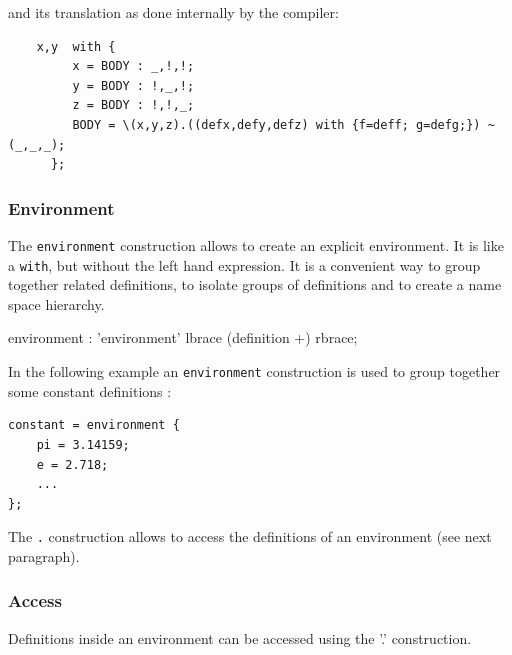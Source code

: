 and its translation as done internally by the compiler:

\begin{lstlisting}
	x,y  with {
		 x = BODY : _,!,!;
		 y = BODY : !,_,!;
		 z = BODY : !,!,_;
		 BODY = \(x,y,z).((defx,defy,defz) with {f=deff; g=defg;}) ~ (_,_,_);
	  };
\end{lstlisting}




\subsubsection{Environment}

The \lstinline'environment' construction allows to create an explicit environment. It is like a \lstinline'with', but without the left hand expression. It is a convenient way to group together related definitions, to isolate groups of definitions and to create a name space hierarchy. 


\begin{rail}
environment : 'environment' lbrace (definition +) rbrace; 
\end{rail}

In the following example an \lstinline'environment' construction is used to group together some constant definitions :

\begin{lstlisting}
constant = environment {
	pi = 3.14159;
	e = 2.718;
	...
};
\end{lstlisting}
The  \lstinline'.' construction allows to access the definitions of an environment (see next paragraph).

\subsubsection{Access} 
Definitions inside an environment can be accessed using 
the '.' construction. 


